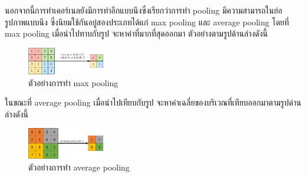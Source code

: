 นอกจากนี้การทำเคอร์เนลยังมีการทำอีกแบบนึงซึ่งเรียกว่าการทำ pooling มีความสามารถในย่อรูปภาพแบบนึง ซึ่งนิยมใช้กันอยู่สองประเภทได้แก่ max pooling และ average pooling
โดยที่ max pooling เมื่อนำไปทาบกับรูป จะหาค่าที่มากที่สุดออกมา ตัวอย่างตามรูปด้านล่างดังนี้

 \begin{figure}[!ht]
	\centering
	\includegraphics[width=0.3\textwidth]{chapter2/images/max_pooling.png}
		\caption{ตัวอย่างการทำ max pooling }
    	\label{fig:example max pooling}
\end{figure} 

ในขณะที่ average pooling เมื่อนำไปเทียบกับรูป จะหาค่าเฉลี่ยของบริเวณที่เทียบออกมาตามรูปด่านล่างดังนี้

 \begin{figure}[!ht]
	\centering
	\includegraphics[width=0.3\textwidth]{chapter2/images/average_pooling.png}
		\caption{ตัวอย่างการทำ average pooling }
    	\label{fig:example average pooling}
\end{figure}
